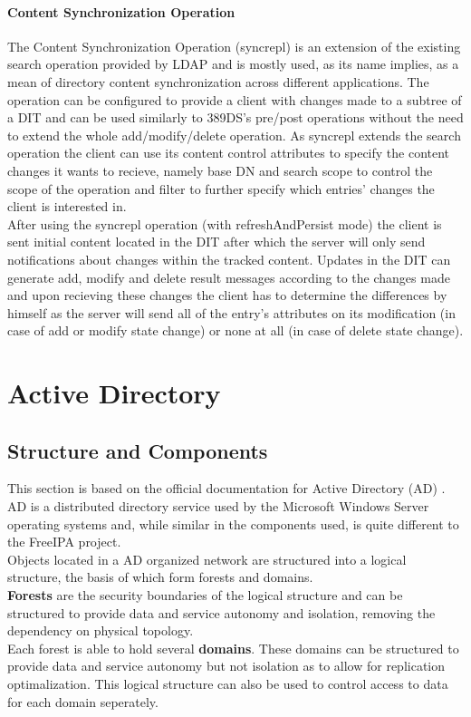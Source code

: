 \subsubsection{Content Synchronization Operation}
The Content Synchronization Operation (syncrepl) is an extension of the existing search operation provided by LDAP and is mostly used, as its name implies, as a mean of directory content synchronization across different applications.
The operation can be configured to provide a client with changes made to a subtree of a DIT and can be used similarly to 389DS's pre/post operations without the need to extend the whole add/modify/delete operation.
As syncrepl extends the search operation the client can use its content control attributes to specify the content changes it wants to recieve, namely base DN and search scope to control the scope of the operation and filter
to further specify which entries' changes the client is interested in.\\
After using the syncrepl operation (with refreshAndPersist mode) the client is sent initial content located in the DIT after which the server will only send notifications about changes within the tracked content. Updates in the DIT can generate add, modify and delete result messages according to the changes made and
upon recieving these changes the client has to determine the differences by himself as the server will send all of the entry's attributes on its modification (in case of add or modify state change) or none at all (in case of delete state change).

\chapter{Active Directory}
\label{chp:ad}

\section{Structure and Components}
This section is based on the official documentation for Active Directory (AD) \cite{ADoverview}.\\
AD is a distributed directory service used by the Microsoft Windows Server operating systems and, while similar in the components used, is quite different to the FreeIPA project.\\
Objects located in a AD organized network are structured into a logical structure, the basis of which form forests and domains. \\
\textbf{Forests} are the security boundaries of the logical structure and can be structured to provide data and service autonomy and isolation, removing the dependency on physical topology. \\
Each forest is able to hold several \textbf{domains}. These domains can be structured to provide data and service autonomy but not isolation as to allow for replication optimalization.
This logical structure can also be used to control access to data for each domain seperately.

